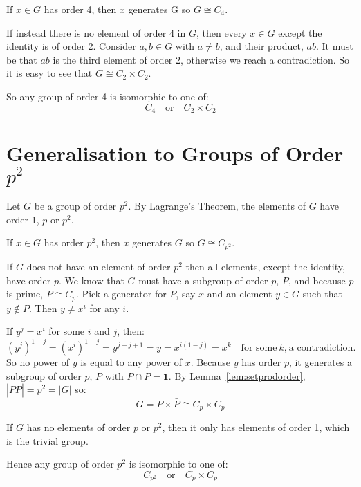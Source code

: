 \documentclass[a4paper, oneside, 12pt, final]{article}
\theoremstyle{definition}
\begin{document}
If \(x \in G\) has order 4, then \(x\) generates G so \(G \cong C_4\).

If instead there is no element of order 4 in \(G\), then every \(x \in G\) except the identity is of
order 2.
Consider \(a, b \in G\) with \(a \neq b\), and their product, \(ab\).
It must be that \(ab\) is the third element of order 2, otherwise we reach a contradiction.
So it is easy to see that \(G \cong C_2 \times C_2\).

So any group of order 4 is isomorphic to one of:
\[C_4 \quad \text{or} \quad C_2 \times C_2\]

\section{Generalisation to Groups of Order \(p^2\)}
Let \(G\) be a group of order \(p^2\).
By Lagrange's Theorem, the elements of \(G\) have order 1, \(p\) or \(p^2\).

If \(x \in G\) has order \(p^2\), then \(x\) generates \(G\) so \(G \cong C_{p^2}\).

If \(G\) does not have an element of order \(p^2\) then all elements, except the identity, have order \(p\).
We know that \(G\) must have a subgroup of order \(p\), \(P\), and because \(p\) is prime, \(P \cong C_p\).
Pick a generator for \(P\), say \(x\) and an element \(y \in G\) such that \(y \notin P\).
Then \(y \neq x^i\) for any \(i\).

If \(y^j = x^i\) for some \(i\) and \(j\), then:
\[{(y^j)}^{1-j} = {(x^i)}^{1-j} = y^{j-j+1} = y = x^{i(1-j)} = x^k \quad \text{for some} \ k\text{,} \ \text{a
contradiction.}\]
So no power of \(y\) is equal to any power of \(x\).
Because \(y\) has order \(p\), it generates a subgroup of order \(p\), \(\bar{P}\) with \(P \cap \bar{P} = \bm{1}\).
By Lemma~\ref{lem:setprodorder}, \(|P\bar{P}| = p^2 = |G|\) so:
\[G = P \times \bar{P} \cong C_p \times C_p\]

If \(G\) has no elements of order \(p\) or \(p^2\), then it only has elements of order 1, which is the trivial group.

Hence any group of order \(p^2\) is isomorphic to one of:
\[C_{p^2} \quad \text{or} \quad C_p \times C_p\]


\end{document}

